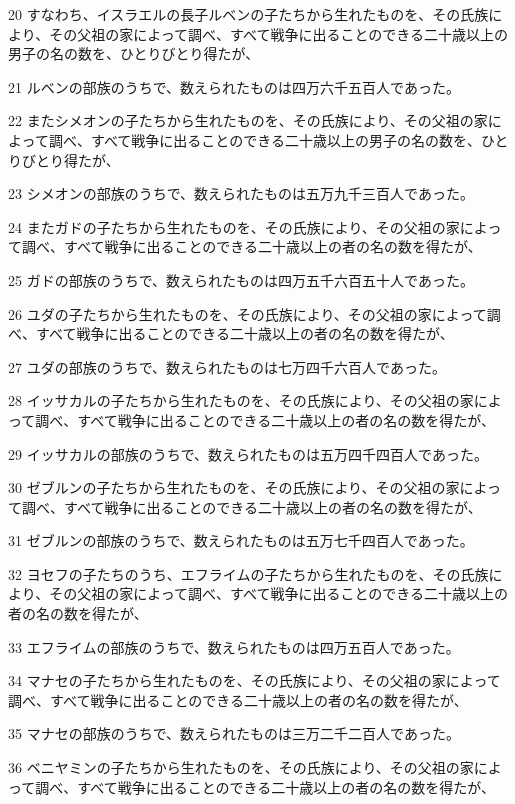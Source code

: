 \par 20 すなわち、イスラエルの長子ルベンの子たちから生れたものを、その氏族により、その父祖の家によって調べ、すべて戦争に出ることのできる二十歳以上の男子の名の数を、ひとりびとり得たが、
\par 21 ルベンの部族のうちで、数えられたものは四万六千五百人であった。
\par 22 またシメオンの子たちから生れたものを、その氏族により、その父祖の家によって調べ、すべて戦争に出ることのできる二十歳以上の男子の名の数を、ひとりびとり得たが、
\par 23 シメオンの部族のうちで、数えられたものは五万九千三百人であった。
\par 24 またガドの子たちから生れたものを、その氏族により、その父祖の家によって調べ、すべて戦争に出ることのできる二十歳以上の者の名の数を得たが、
\par 25 ガドの部族のうちで、数えられたものは四万五千六百五十人であった。
\par 26 ユダの子たちから生れたものを、その氏族により、その父祖の家によって調べ、すべて戦争に出ることのできる二十歳以上の者の名の数を得たが、
\par 27 ユダの部族のうちで、数えられたものは七万四千六百人であった。
\par 28 イッサカルの子たちから生れたものを、その氏族により、その父祖の家によって調べ、すべて戦争に出ることのできる二十歳以上の者の名の数を得たが、
\par 29 イッサカルの部族のうちで、数えられたものは五万四千四百人であった。
\par 30 ゼブルンの子たちから生れたものを、その氏族により、その父祖の家によって調べ、すべて戦争に出ることのできる二十歳以上の者の名の数を得たが、
\par 31 ゼブルンの部族のうちで、数えられたものは五万七千四百人であった。
\par 32 ヨセフの子たちのうち、エフライムの子たちから生れたものを、その氏族により、その父祖の家によって調べ、すべて戦争に出ることのできる二十歳以上の者の名の数を得たが、
\par 33 エフライムの部族のうちで、数えられたものは四万五百人であった。
\par 34 マナセの子たちから生れたものを、その氏族により、その父祖の家によって調べ、すべて戦争に出ることのできる二十歳以上の者の名の数を得たが、
\par 35 マナセの部族のうちで、数えられたものは三万二千二百人であった。
\par 36 ベニヤミンの子たちから生れたものを、その氏族により、その父祖の家によって調べ、すべて戦争に出ることのできる二十歳以上の者の名の数を得たが、
